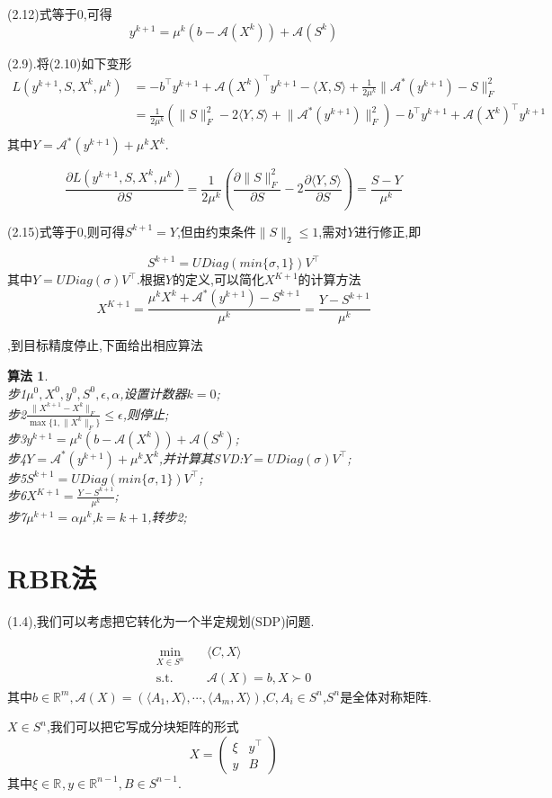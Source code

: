 \documentclass[UTF8]{ctexart}
\newtheorem{algo}{算法}
\newcommand{\s}{\quad}
\newcommand{\p}{\paragraph{}\s}
\newcommand{\sect}{\section}
\newcommand{\equSplit}[1]{\begin{equation}\begin{split}#1\end{split}\end{equation}}
\newcommand{\equ}[1]{\begin{equation}#1\end{equation}}
\newcommand{\Tst}{\text{s.t.}\s}
\newcommand{\norm}[1]{\lVert#1\rVert}
\newcommand{\inprod}[1]{\langle#1\rangle}
\newcommand{\Real}[1]{\mathbb{R}^{#1}}
\newcommand{\Ma}{\mathcal{A}}
\newcommand{\partD}[2]{\frac{\partial#1}{\partial#2}}
\newcommand{\pMa}[1]{\begin{pmatrix}#1\end{pmatrix}}
\numberwithin{equation}{section}
\begin{document}
		(2.12)式等于0,可得
		\equ{y^{k+1}=\mu^k(b-\Ma(X^k))+\Ma(S^k)}

		(2.9).将(2.10)如下变形
		\equSplit{
			L(y^{k+1},S,X^k,\mu^k)&=-b^\top y^{k+1}+\Ma(X^k)^\top y^{k+1}-\inprod{X,S}+\frac{1}{2\mu^k}\norm{\Ma^*(y^{k+1})-S}^2_F\\
			&=\frac{1}{2\mu^k}(\norm{S}_F^2-2\inprod{Y,S}+\norm{\Ma^*(y^{k+1})}_F^2)-b^\top y^{k+1}+\Ma(X^k)^\top y^{k+1}\\
		}
		其中$Y=\Ma^*(y^{k+1})+\mu^kX^k$.

		\equ{
			\partD{L(y^{k+1},S,X^k,\mu^k)}{S}=\frac{1}{2\mu^k}(\partD{\norm{S}_F^2}{S}-2\partD{\inprod{Y,S}}{S})=\frac{S-Y}{\mu^k}
		}

		(2.15)式等于0,则可得$S^{k+1}=Y$,但由约束条件$\norm{S}_2\leq1$,需对$Y$进行修正,即

		\equ{S^{k+1}=UDiag(min\{\sigma,1\})V^\top}
		其中$Y=UDiag(\sigma)V^\top$.根据$Y$的定义,可以简化$X^{K+1}$的计算方法
		\equ{X^{K+1}=\frac{\mu^kX^k+\Ma^*(y^{k+1})-S^{k+1}}{\mu^k}=\frac{Y-S^{k+1}}{\mu^k}}

		,到目标精度停止,下面给出相应算法

		\begin{algo}
			\s\\
			步1$\mu^0,X^0,y^0,S^0,\epsilon,\alpha$,设置计数器$k=0$;\\
			步2$\frac{\norm{X^{k+1}-X^k}_F}{\max\{1,\norm{X^k}_F\}}\leq\epsilon$,则停止;\\
			步3$y^{k+1}=\mu^k(b-\Ma(X^k))+\Ma(S^k)$;\\
			步4$Y=\Ma^*(y^{k+1})+\mu^kX^k$,并计算其SVD:$Y=UDiag(\sigma)V^\top$;\\
			步5$S^{k+1}=UDiag(min\{\sigma,1\})V^\top$;\\
			步6$X^{K+1}=\frac{Y-S^{k+1}}{\mu^k}$;\\
			步7$\mu^{k+1}=\alpha\mu^k$,$k=k+1$,转步2;
		\end{algo}

	\sect{RBR法}
		(1.4),我们可以考虑把它转化为一个半定规划(SDP)问题.

		\equSplit{
			\min_{X\in S^n}\s&\inprod{C,X}\\
			\Tst&\Ma(X)=b,X\succ0}
		其中$b\in\Real{m},\Ma(X)=(\inprod{A_1,X},\cdots,\inprod{A_m,X})$,$C,A_i\in S^n$,$S^n$是全体对称矩阵.

		$X\in S^n$,我们可以把它写成分块矩阵的形式
		\equ{
			X=\pMa{\xi&y^\top\\ y&B}
		}
		其中$\xi\in\Real{},y\in\Real{n-1},B\in S^{n-1}$.
\end{document}
